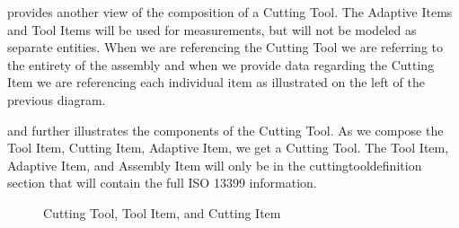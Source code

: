 \FloatBarrier

 provides another view of the composition of a Cutting Tool.  The Adaptive Items and Tool Items will be used for measurements, but will not be modeled as separate entities.  When we are referencing the Cutting Tool we are referring to the entirety of the assembly and when we provide data regarding the Cutting Item we are referencing each individual item as illustrated on the left of the previous diagram.

 and  further illustrates the components of the Cutting Tool.  As we compose the Tool Item, Cutting Item, Adaptive Item, we get a Cutting Tool.  The Tool Item, Adaptive Item, and Assembly Item will only be in the \gls{cuttingtooldefinition} section that will contain the full ISO 13399 information.

\begin{figure}[ht]
  \centering
  \caption{Cutting Tool, Tool Item, and Cutting Item}
  \label{fig:cutting-tool-tool-item-cutting-item}
\end{figure}

\FloatBarrier

